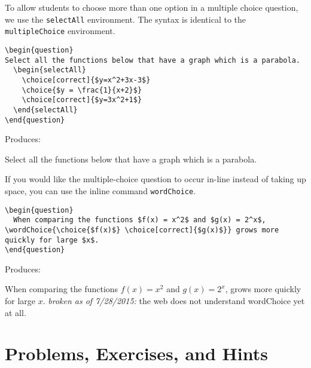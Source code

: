 \documentclass{ximera}
\begin{document}
\begin{example}
To allow students to choose more than one option in a multiple choice question, we use the \verb!selectAll! environment. The syntax is identical to the \verb!multipleChoice! environment.

\begin{verbatim}
\begin{question}
Select all the functions below that have a graph which is a parabola.
  \begin{selectAll}
    \choice[correct]{$y=x^2+3x-3$}
    \choice{$y = \frac{1}{x+2}$}
    \choice[correct]{$y=3x^2+1$}
  \end{selectAll}
\end{question}
\end{verbatim}

Produces:

\begin{question}
Select all the functions below that have a graph which is a parabola.
  \begin{selectAll}
  \end{selectAll}
\end{question}

\end{example}

\begin{example}
If you would like the multiple-choice question to occur in-line instead of taking up space, you can use the inline command \verb!wordChoice!.
 
\begin{verbatim}
\begin{question}
  When comparing the functions $f(x) = x^2$ and $g(x) = 2^x$, \wordChoice{\choice{$f(x)$} \choice[correct]{$g(x)$}} grows more quickly for large $x$.
\end{question}
\end{verbatim}

Produces:

\begin{question}
  When comparing the functions $f(x) = x^2$ and $g(x) = 2^x$,  grows more quickly for large $x$.
  \emph{broken as of 7/28/2015:} the web does not understand wordChoice yet at all.
\end{question}
\end{example}

\section{Problems, Exercises, and Hints} \label{ProblemContainers}
\end{document}

